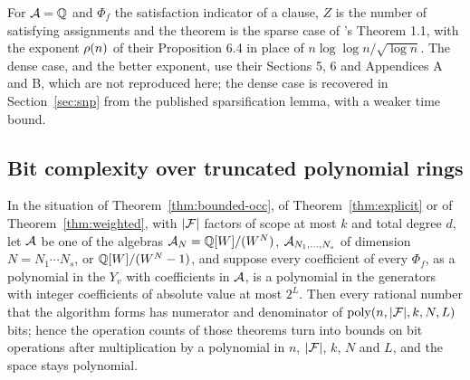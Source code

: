 \begin{remark}
For $\mathcal{A}=\mathbb{Q}$ and $\Phi_f$ the satisfaction indicator of a clause, $Z$ is the number
of satisfying assignments and the theorem is the sparse case of
\oai{}'s Theorem 1.1, with the exponent $\rho(n)$ of their Proposition 6.4 in
place of $n\log\log n/\sqrt{\log n}$. The dense case, and the better exponent, use
their Sections 5, 6 and Appendices A and B, which are not reproduced here; the
dense case is recovered in Section~\ref{sec:snp} from the published
sparsification lemma, with a weaker time bound.
\end{remark}

\subsection{Bit complexity over truncated polynomial rings}
\begin{lemma}\label{lem:bits}
In the situation of Theorem~\ref{thm:bounded-occ}, of Theorem~\ref{thm:explicit} or of Theorem~\ref{thm:weighted},
with $|\mathcal{F}|$ factors of scope at most $k$ and total degree $d$, let $\mathcal{A}$ be one of the algebras
$\mathcal{A}_N=\mathbb{Q}[W]/(W^N)$, $\mathcal{A}_{N_1,\dots,N_s}$ of dimension $N=N_1\cdots N_s$, or
$\mathbb{Q}[W]/(W^N-1)$, and suppose every coefficient of every $\Phi_f$, as a polynomial
in the $Y_v$ with coefficients in $\mathcal{A}$, is a polynomial in the generators with
integer coefficients of absolute value at most $2^{L}$. Then every rational number that the algorithm
forms has numerator and denominator of $\operatorname{poly}(n,|\mathcal{F}|,k,N,L)$ bits; hence the operation
counts of those theorems turn into bounds on bit operations after multiplication
by a polynomial in $n$, $|\mathcal{F}|$, $k$, $N$ and $L$, and the space stays polynomial.
\end{lemma}

